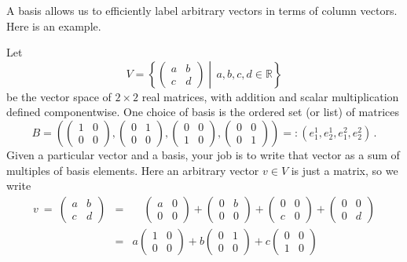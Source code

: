 \noindent
A basis allows us to efficiently label arbitrary vectors in terms of column vectors. Here is an  example.
\begin{example}
Let $$V=\left\{\begin{pmatrix}a&b\\c&d\end{pmatrix}\middle| \,a,b,c,d\in {\mathbb R}\right\}$$ be the vector space of $2\times 2$ real matrices,
with addition and scalar multiplication defined componentwise. 
One choice of basis is the ordered set (or list) of matrices
$$B=\left(\begin{pmatrix}1&0\\0&0\end{pmatrix},\begin{pmatrix}0&1\\0&0\end{pmatrix},\begin{pmatrix}0&0\\ 1&0\end{pmatrix},\begin{pmatrix}0&0\\ 0&1\end{pmatrix}\right)=:(e_1^1,e_2^1,e^2_1,e^2_2)\, .$$ 
Given a particular vector and a basis, your job is to write that vector as a sum of multiples of basis elements. Here
an arbitrary vector $v\in V$ is just a matrix, so we write
\begin{eqnarray*}
v\ =\ \begin{pmatrix}a&b\\c&d\end{pmatrix}&=&\quad\!\! \begin{pmatrix}a&0\\0&0\end{pmatrix}+\begin{pmatrix}0&b\\0&0\end{pmatrix}+\begin{pmatrix}0&0\\ c&0\end{pmatrix}+\begin{pmatrix}0&0\\0&d\end{pmatrix}\\[1mm]
&=&a\begin{pmatrix}1&0\\0&0\end{pmatrix}+b\begin{pmatrix}0&1\\0&0\end{pmatrix}+c\begin{pmatrix}0&0\\ 1&0\end{pmatrix}

\end{eqnarray*}
\end{example}

